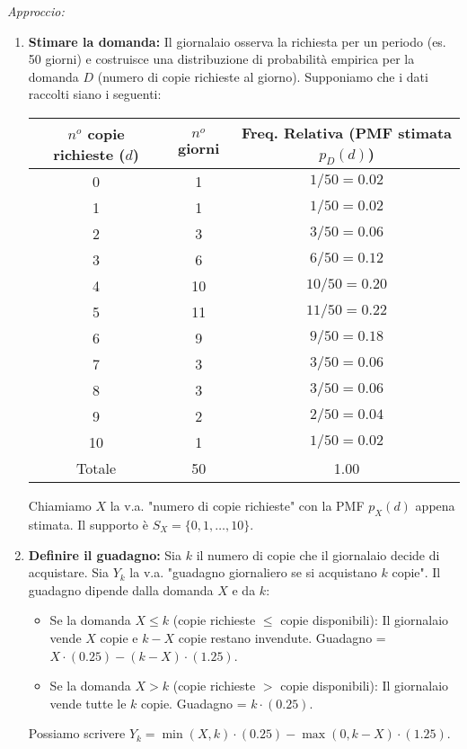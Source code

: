 \textit{Approccio:}
\begin{enumerate}
    \item \textbf{Stimare la domanda:} Il giornalaio osserva la richiesta per un periodo (es. 50 giorni) e costruisce una distribuzione di probabilità empirica per la domanda $D$ (numero di copie richieste al giorno).
    Supponiamo che i dati raccolti siano i seguenti:
    \begin{center}
    \begin{tabular}{ccc}
    \toprule
    $n^o$ copie richieste ($d$) & $n^o$ giorni & Freq. Relativa (PMF stimata $p_D(d)$) \\
    \midrule
    0 & 1 & $1/50 = 0.02$ \\
    1 & 1 & $1/50 = 0.02$ \\
    2 & 3 & $3/50 = 0.06$ \\
    3 & 6 & $6/50 = 0.12$ \\
    4 & 10 & $10/50 = 0.20$ \\
    5 & 11 & $11/50 = 0.22$ \\
    6 & 9 & $9/50 = 0.18$ \\
    7 & 3 & $3/50 = 0.06$ \\
    8 & 3 & $3/50 = 0.06$ \\
    9 & 2 & $2/50 = 0.04$ \\
    10 & 1 & $1/50 = 0.02$ \\
    \midrule
    Totale & 50 & 1.00 \\
    \bottomrule
    \end{tabular}
    \end{center}
    Chiamiamo $X$ la v.a. "numero di copie richieste" con la PMF $p_X(d)$ appena stimata. Il supporto è $S_X=\{0, 1, \dots, 10\}$.

    \item \textbf{Definire il guadagno:} Sia $k$ il numero di copie che il giornalaio decide di acquistare.
    Sia $Y_k$ la v.a. "guadagno giornaliero se si acquistano $k$ copie".
    Il guadagno dipende dalla domanda $X$ e da $k$:
    \begin{itemize}
        \item Se la domanda $X \le k$ (copie richieste $\le$ copie disponibili):
        Il giornalaio vende $X$ copie e $k-X$ copie restano invendute.
        Guadagno = $X \cdot (0.25) - (k-X) \cdot (1.25)$.
        \item Se la domanda $X > k$ (copie richieste $>$ copie disponibili):
        Il giornalaio vende tutte le $k$ copie.
        Guadagno = $k \cdot (0.25)$.
    \end{itemize}
    Possiamo scrivere $Y_k = \min(X, k) \cdot (0.25) - \max(0, k-X) \cdot (1.25)$.


\end{enumerate}
